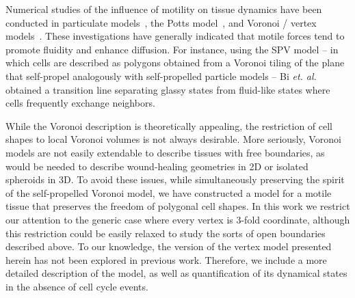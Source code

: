 \documentclass[
reprint
,aps
,amssymb
,amsmath
,superscriptaddress
]{revtex4-1}
\begin{document}
Numerical studies of the influence of motility on tissue dynamics have been conducted in particulate models~\cite{Henkes2011}, the Potts model~\cite{Kabla2012, Chiang2016}, and Voronoi / vertex models~\cite{Bi2016, Giavazzi2017-2,Sussman2017-2,Sussman2018-2}. These investigations have generally indicated that motile forces tend to promote fluidity and enhance diffusion. For instance, using the SPV model -- in which cells are described as polygons obtained from a Voronoi tiling of the plane that self-propel analogously with self-propelled particle models -- Bi \textit{et. al.}~\cite{Bi2016} obtained a transition line separating glassy states from fluid-like states where cells frequently exchange neighbors. %

While the Voronoi description is theoretically appealing, the restriction of cell shapes to local Voronoi volumes is not always desirable. More seriously, Voronoi models are not easily extendable to describe tissues with free boundaries, as would be needed to describe wound-healing geometries in 2D or isolated spheroids in 3D. To avoid these issues, while simultaneously preserving the spirit of the self-propelled Voronoi model, we have constructed a model for a motile tissue that preserves the freedom of polygonal cell shapes. In this work we restrict our attention to the generic case where every vertex is 3-fold coordinate, although this restriction could be easily relaxed to study the sorts of open boundaries described above. To our knowledge, the version of the vertex model presented herein has not been explored in previous work. Therefore, we include a more detailed description of the model, as well as quantification of its dynamical states in the absence of cell cycle events.


\end{document}
